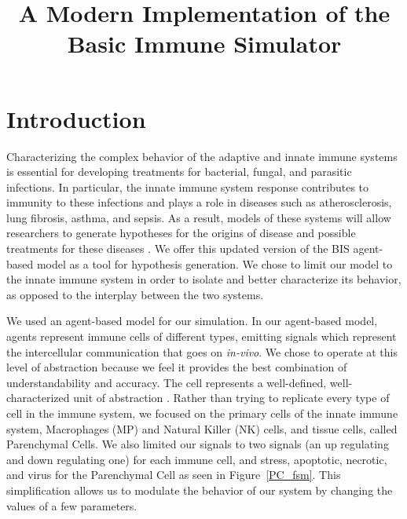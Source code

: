 \documentclass[10pt,conference]{IEEEtran}
\begin{document}
\title{A Modern Implementation of the \\
Basic Immune Simulator}

\author{
}

\maketitle
\thispagestyle{plain}
\pagestyle{plain}

\section{Introduction}
\noindent
Characterizing the complex behavior of the adaptive and innate immune systems is essential for developing treatments for bacterial, fungal,
and parasitic infections. In particular, the innate immune system response contributes to immunity to these infections and plays a role in
diseases such
as atherosclerosis, lung fibrosis, asthma, and sepsis. As a result, models of these systems will allow researchers to generate hypotheses for
the origins of disease and possible treatments for these diseases \cite{Folcik:2007}. We offer this updated version of the BIS agent-based
model
as a tool for hypothesis generation. We chose to limit our model to the innate immune system in order to isolate and better characterize its
behavior, as opposed to the interplay between the two systems.

\indent
We used an agent-based model for our simulation. In our agent-based model, agents represent immune cells of
different types, emitting signals which represent the intercellular
communication that goes on \textit{in-vivo}. We chose to operate at this level of abstraction because we feel it provides the best combination
of understandability and accuracy. The cell represents a well-defined, well-characterized unit of abstraction \cite{Folcik:2007}.  Rather than
trying to replicate every type of cell in the immune system, we
focused on the primary cells of the innate immune system,
Macrophages (MP) and Natural Killer (NK) cells, and tissue cells, called Parenchymal Cells. We also limited our signals to two signals (an up
regulating and down regulating one) for each immune cell, and stress, apoptotic, necrotic, and virus for the Parenchymal Cell as seen in
Figure~\ref{PC_fsm}. This simplification allows us to modulate the behavior of our system by changing the values of a few parameters.
\end{document}
